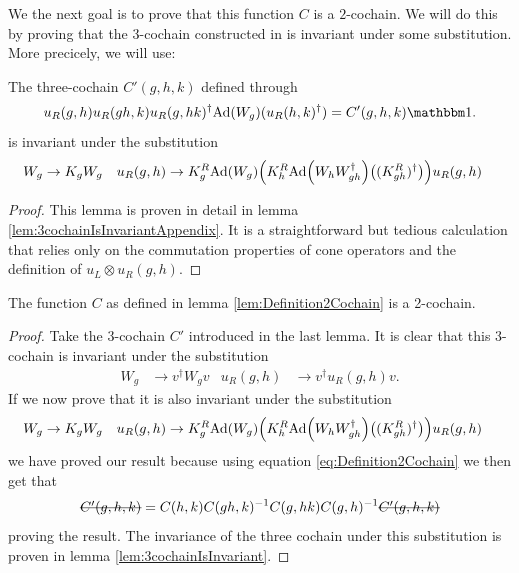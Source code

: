 \documentclass[11pt,a4paper,twoside]{article}
\numberwithin{equation}{section}
\begin{document}
	We the next goal is to prove that this function $C$ is a $2$-cochain. We will do this by proving that the $3$-cochain constructed in \cite{ogata2021h3gmathbb} is invariant under some substitution. More precicely, we will use:
	\begin{lemma}\label{lem:3cochainIsInvariant}
		The three-cochain $C'(g,h,k)$ defined through
		\begin{equation}\label{eq:defintion3CochainProof2Cochain}
			u_R(g,h)u_R(gh,k)u_R(g,hk)^\dagger\Ad{W_g}(u_R(h,k)^\dagger)=C'(g,h,k)\id.
		\end{equation}
		is invariant under the substitution
		\begin{align}\label{eq:SubstitutionForProofCochain}
			W_g&\rightarrow K_g W_g&u_R(g,h)&\rightarrow K_g^R\Ad{W_g}\left(K_h^R\Ad{W_hW_{gh}^\dagger}\left((K_{gh}^R)^\dagger\right)\right)u_
			R(g,h)
		\end{align}
	\end{lemma}
	\begin{proof}
		This lemma is proven in detail in lemma \ref{lem:3cochainIsInvariantAppendix}. It is a straightforward but tedious calculation that relies only on the commutation properties of cone operators and the definition of $u_L\otimes u_R(g,h)$.
	\end{proof}
	\begin{lemma}
		The function $C$ as defined in lemma \ref{lem:Definition2Cochain} is a 2-cochain.
	\end{lemma}
	\begin{proof}
		Take the 3-cochain $C'$ introduced in the last lemma. It is clear that this 3-cochain is invariant under the substitution
		\begin{align}
			W_g&\rightarrow v^\dagger W_g v&u_R(g,h)&\rightarrow v^\dagger u_R(g,h)v.
		\end{align}
		If we now prove that it is also invariant under the substitution
		\begin{align}\label{eq:SubstitutionForProofCochain}
			W_g&\rightarrow K_g W_g&u_R(g,h)&\rightarrow K_g^R\Ad{W_g}\left(K_h^R\Ad{W_hW_{gh}^\dagger}\left((K_{gh}^R)^\dagger\right)\right)u_
			R(g,h)
		\end{align}
		we have proved our result because using equation \eqref{eq:Definition2Cochain} we then get that
		\begin{equation}
			\stkout{C'(g,h,k)}=C(h,k)C(gh,k)^{-1}C(g,hk)C(g,h)^{-1}\stkout{C'(g,h,k)}
		\end{equation}
		proving the result. The invariance of the three cochain under this substitution is proven in lemma \ref{lem:3cochainIsInvariant}.
	\end{proof}
\end{document}
